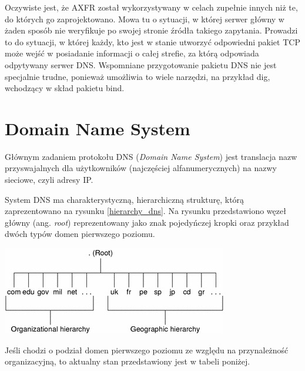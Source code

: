 Oczywiste jest, że AXFR został wykorzystywany w celach zupełnie innych niż te, do których go zaprojektowano. Mowa tu o sytuacji, w której serwer główny w żaden sposób nie weryfikuje po swojej stronie źródła takiego zapytania. Prowadzi to do sytuacji, w której każdy, kto jest w stanie utworzyć odpowiedni pakiet TCP może wejść w posiadanie informacji o całej strefie, za którą odpowiada odpytywany serwer DNS. Wspomniane przygotowanie pakietu DNS nie jest specjalnie trudne, ponieważ umożliwia to wiele narzędzi, na przykład dig, wchodzący w skład pakietu bind. 

\section{Domain Name System}
Głównym zadaniem protokołu DNS (\textit{Domain Name System}) jest translacja nazw przyswajalnych dla użytkowników (najczęściej alfanumerycznych) na nazwy sieciowe, czyli adresy IP. 

System DNS ma charakterystyczną, hierarchiczną strukturę, którą zaprezentowano na rysunku \ref{hierarchy_dns}. Na rysunku przedstawiono węzeł główny (ang. \textit{root}) reprezentowany jako znak pojedyńczej kropki oraz przykład dwóch typów domen pierwszego poziomu.

\begin{center}
	\includegraphics[scale=1]{image/hierarchy_dns}\label{hierarchy_dns}
\end{center}

Jeśli chodzi o podział domen pierwszego poziomu ze względu na przynależność organizacyjną, to aktualny stan przedstawiony jest w tabeli poniżej.

